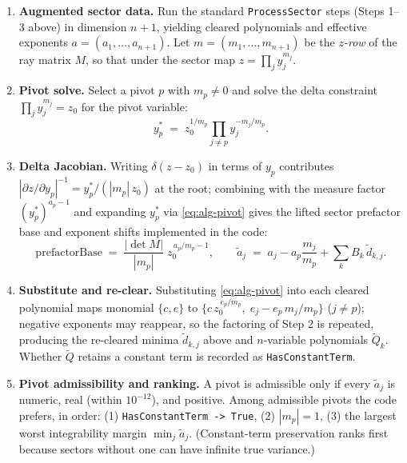 \documentclass[11pt,a4paper]{article}
\begin{document}
\begin{enumerate}
  \item \textbf{Augmented sector data.} Run the standard
    \texttt{ProcessSector} steps (Steps 1--3 above) in dimension $n{+}1$,
    yielding cleared polynomials and effective exponents
    $a = (a_1, \ldots, a_{n+1})$. Let $m = (m_1, \ldots, m_{n+1})$ be the
    \emph{$z$-row} of the ray matrix $M$, so that under the sector map
    $z = \prod_j y_j^{m_j}$.

  \item \textbf{Pivot solve.} Select a pivot $p$ with $m_p \neq 0$ and solve
    the delta constraint $\prod_j y_j^{m_j} = z_0$ for the pivot variable:
    \begin{equation}\label{eq:alg-pivot}
    y_p^{*} \;=\; z_0^{1/m_p} \prod_{j \neq p} y_j^{-m_j/m_p}.
    \end{equation}

  \item \textbf{Delta Jacobian.} Writing $\delta(z - z_0)$ in terms of $y_p$
    contributes $|\partial z/\partial y_p|^{-1} = y_p^{*}/(|m_p|\, z_0)$ at the
    root; combining with the measure factor $(y_p^{*})^{a_p - 1}$ and
    expanding $y_p^{*}$ via \eqref{eq:alg-pivot} gives the lifted sector
    prefactor base and exponent shifts implemented in the code:
    \begin{equation}
    \mathrm{prefactorBase} \;=\; \frac{|\det M|}{|m_p|}\; z_0^{\,a_p/m_p - 1},
    \qquad
    \tilde{a}_j \;=\; a_j - a_p \frac{m_j}{m_p} + \sum_k B_k\, \tilde{d}_{k,j}.
    \end{equation}

  \item \textbf{Substitute and re-clear.} Substituting \eqref{eq:alg-pivot}
    into each cleared polynomial maps monomial $\{c, e\}$ to
    $\{c\, z_0^{\,e_p/m_p},\; e_j - e_p\, m_j/m_p\}$ ($j \neq p$); negative
    exponents may reappear, so the factoring of Step 2 is repeated, producing
    the re-cleared minima $\tilde{d}_{k,j}$ above and $n$-variable polynomials
    $\tilde{Q}_k$. Whether $\tilde{Q}$ retains a constant term is recorded as
    \texttt{HasConstantTerm}.

  \item \textbf{Pivot admissibility and ranking.} A pivot is admissible only
    if every $\tilde{a}_j$ is numeric, real (within $10^{-12}$), and
    positive. Among admissible pivots the code prefers, in order: (1)
    \texttt{HasConstantTerm -> True}, (2) $|m_p| = 1$, (3) the largest worst
    integrability margin $\min_j \tilde{a}_j$. (Constant-term preservation
    ranks first because sectors without one can have infinite true
    variance.)


\end{enumerate}
\end{document}

